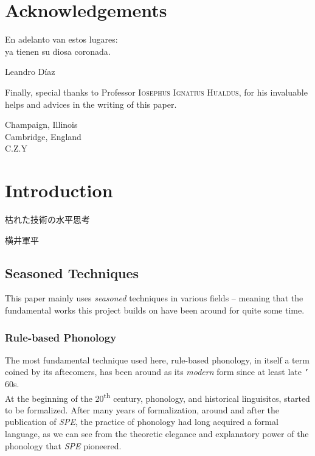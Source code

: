 \documentclass{report}[12pt]
\begin{document}
\pagebreak

\chapter*{Acknowledgements}

\epigraph{En adelanto van estos lugares: \\ ya tienen su diosa coronada.}{Leandro Díaz}

Finally, special thanks to Professor \textsc{Iosephus Ignatius Hualdus}, for his invaluable helps and advices in the writing of this paper. 

\begin{flushright}
Champaign, Illinois \\
Cambridge, England \\
C.Z.Y
\end{flushright}

\chapter*{Introduction}

\epigraph{枯れた技術の水平思考\footnotemark}{横井軍平}

\section*{Seasoned Techniques}

This paper mainly uses \emph{seasoned} techniques in various fields -- meaning that the fundamental works this project builds on have been around for quite some time. 

\subsection*{Rule-based Phonology}

The most fundamental technique used here, rule-based phonology, in itself a term coined by its aftecomers, has been around as its \emph{modern} form since at least late \texttt{'}\kern-1pt 60s. \\
At the beginning of the 20\textsuperscript{th} century, phonology, and historical linguisitcs, started to be formalized. After many years of formalization, around and after the publication of \emph{SPE}, the practice of phonology had long acquired a formal language, as we can see from the theoretic elegance and explanatory power of the phonology that \emph{SPE} pioneered.
\end{document}
